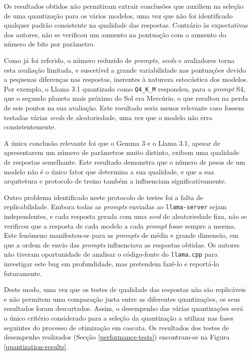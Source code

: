 \documentclass[11pt, a4paper]{article}
\begin{document}
Os resultados obtidos não permitiram extrair conclusões que auxiliem na seleção de uma quantização
para os vários modelos, uma vez que não foi identificado qualquer padrão consistente na qualidade
das respostas. Contrário às expectativas dos autores, não se verificou um aumento na pontuação com o
aumento do número de bits por parâmetro.

Como já foi referido, o número reduzido de \emph{prompts}, \emph{seeds} e avaliadores torna esta
avaliação limitada, e suscetível a grande variabilidade nas pontuações devido a pequenas diferenças
nas respostas, inerentes à natureza estocástica dos modelos. Por exemplo, o Llama 3.1 quantizado
como \texttt{Q4\_K\_M} respondeu, para a \emph{prompt} S4, que o segundo planeta mais próximo do Sol
era Mercúrio, o que resultou na perda de seis pontos na sua avaliação. Este resultado seria menos
relevante caso fossem testadas várias \emph{seeds} de aleatoriedade, uma vez que o modelo não erra
consistentemente.

A única conclusão relevante foi que o Gemma 3 e o Llama 3.1, apesar de apresentarem um número de
parâmetros muito distinto, exibem uma qualidade de respostas semelhante. Este resultado demonstra
que o número de pesos de um modelo não é o único fator que determina a sua qualidade, e que a sua
arquitetura e protocolo de treino também a influenciam significativamente.

Outro problema identificado neste protocolo de testes foi a falta de replicabilidade. Embora todas
as \emph{prompts} enviadas ao \texttt{llama-server} sejam independentes, e cada resposta gerada com
uma \emph{seed} de aleatoriedade fixa, não se verificou que a resposta de cada modelo a cada
\emph{prompt} fosse sempre a mesma. Este fenómeno manifestou-se para as \emph{prompts} de média e
grande dimensão, em que a ordem de envio das \emph{prompts} influenciava as respostas obtidas. Os
autores não tiveram oportunidade de analisar o código-fonte do \texttt{llama.cpp} para investigar
este bug em profundidade, mas pretendem fazê-lo e reportá-lo futuramente.

Deste modo, uma vez que os testes de qualidade das respostas não são replicáveis e não permitem uma
comparação justa entre as diferentes quantizações, os seus resultados foram descartados. Assim, o
desempenho das várias quantizações será o único critério considerado para a seleção da quantização a
utilizar nas fases seguintes do processo de otimização em cascata. Os resultados dos testes de
desempenho realizados (Secção \ref{performance-tests}) encontram-se na Figura
\ref{quantization-results}.
\end{document}
